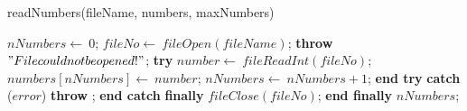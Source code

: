 \documentclass[a4paper,10pt]{article}
\begin{document}
\begin{algorithm}
\caption{readNumbers(fileName, numbers, maxNumbers)}
\begin{algorithmic}[5]

\STATE {}
\STATE {}
\STATE {}
  \STATE \(nNumbers\gets\ 0\);
  \STATE \(fileNo\gets\ fileOpen(fileName)\);
    \STATE \textbf{throw} \("File could not be opened!"\);
  \ENDIF
  \STATE \textbf{try}  \BODY
      \STATE \(number\gets\ fileReadInt(fileNo)\);
      \STATE \(numbers[nNumbers]\gets\ number\);
      \STATE \(nNumbers\gets\ nNumbers+1\);
    \ENDWHILE
  \ENDBODY \STATE \textbf{end try}
  \STATE \textbf{catch} (\(error\)) \BODY
    \STATE \textbf{throw} \(\);
  \ENDBODY \STATE \textbf{end catch}
  \STATE \textbf{finally} \BODY
    \STATE \(fileClose(fileNo)\);
  \ENDBODY \STATE \textbf{end finally}
  \RETURN\(nNumbers\);

\end{algorithmic}
\end{algorithm}
\end{document}
